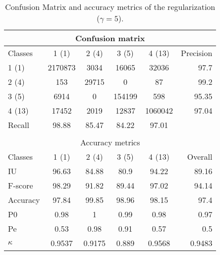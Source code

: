 \begin{table}[H]
\begin{center}
\footnotesize
\begin{tabular}{|l|c|c|c|c|r|}
\hline
\multicolumn{6}{|c|}{Confusion matrix} \\
\hline
 Classes & 1 (1) & 2 (4) & 3 (5) & 4 (13) & Precision \\
\hline
1 (1) & 2170873 & 3034 & 16065 & 32036 & 97.7 \\
\hline
2 (4) & 153 & 29715 & 0 & 87 & 99.2 \\
\hline
3 (5) & 6914 & 0 & 154199 & 598 & 95.35 \\
\hline
4 (13) & 17452 & 2019 & 12837 & 1060042 & 97.04 \\
\hline
Recall & 98.88 & 85.47 & 84.22 & 97.01 &  \\
\hline
\multicolumn{6}{c}{ } \\
\hline
\multicolumn{6}{|c|}{Accuracy metrics} \\
\hline
 Classes & 1 (1) & 2 (4) & 3 (5) & 4 (13) & Overall \\
\hline
IU & 96.63 & 84.88 & 80.9 & 94.22 & 89.16 \\
\hline
F-score & 98.29 & 91.82 & 89.44 & 97.02 & 94.14 \\
\hline
Accuracy & 97.84 & 99.85 & 98.96 & 98.15 & 97.4 \\
\hline
P0 & 0.98 & 1 & 0.99 & 0.98 & 0.97 \\
\hline
Pe & 0.53 & 0.98 & 0.91 & 0.57 & 0.5 \\
\hline
$\kappa$ & 0.9537 & 0.9175 & 0.889 & 0.9568 & 0.9483 \\
\hline
\end{tabular}
\caption{Confusion Matrix and accuracy metrics of the regularization ($\gamma=5$).}
\label{table:}
\end{center}
\end{table}
